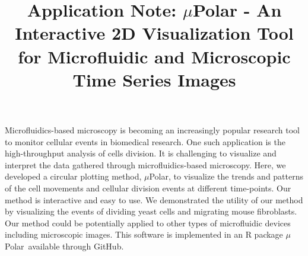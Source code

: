 \documentclass[conference]{IEEEtran}
\begin{document}
\title{ Application Note: $\mu$Polar \-- An Interactive 2D Visualization Tool for  Microfluidic and  Microscopic Time Series Images }

 \author{
 \and
 }

\maketitle


\begin{Summary}
Microfluidics-based microscopy is becoming an increasingly popular research tool to monitor cellular events in biomedical research. One such application is the high-throughput analysis of cells division. It is challenging to visualize and interpret the data gathered through microfluidics-based microscopy. Here, we developed a circular plotting method, $\mu$Polar, to visualize the trends and patterns of the cell movements and cellular division events at different time-points. Our method is interactive and easy to use. We demonstrated the utility of our method by visualizing the events of dividing yeast cells and migrating mouse fibroblasts. Our method could be potentially applied to other types of microfluidic devices including microscopic images. This software is implemented in an R package $\mu$Polar\ available through GitHub.

\end{Summary}
\end{document}
